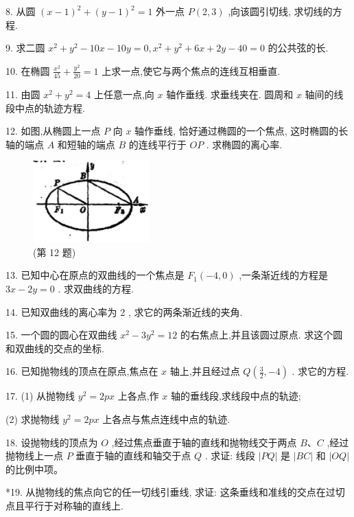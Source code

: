 \documentclass[lang=cn,newtx,12pt,scheme=chinese]{elegantbook}
\begin{document}
8. 从圆 \({\left( x - 1\right) }^{2} + {\left( y - 1\right) }^{2} = 1\) 外一点 \(P\left( {2,3}\right)\) ,向该圆引切线, 求切线的方程.

9. 求二圆 \({x}^{2} + {y}^{2} - {10x} - {10y} = 0,{x}^{2} + {y}^{2} + {6x} + {2y} - {40} = 0\) 的公共弦的长.

10. 在椭圆 \(\frac{{x}^{2}}{45} + \frac{{y}^{2}}{20} = 1\) 上求一点,使它与两个焦点的连线互相垂直.

11. 由圆 \({x}^{2} + {y}^{2} = 4\) 上任意一点,向 \(x\) 轴作垂线. 求垂线夹在. 圆周和 \(x\) 轴间的线段中点的轨迹方程.

12. 如图,从椭圆上一点 \(P\) 向 \(x\) 轴作垂线, 恰好通过椭圆的一个焦点, 这时椭圆的长轴的端点 \(A\) 和短轴的端点 \(B\) 的连线平行于 \({OP}\) . 求椭圆的离心率.

\begin{figure}[h]
  \centering
  \includegraphics[max width=0.4\textwidth]{images/01912cc2-ffb6-728e-9ae7-b113ff05c64b_130_291818.jpg}
  \caption{(第 12 题)}
\end{figure}

13. 已知中心在原点的双曲线的一个焦点是 \({F}_{1}\left( {-4,0}\right)\) ,一条渐近线的方程是 \({3x} - {2y} = 0\) . 求双曲线的方程.

14. 已知双曲线的离心率为 2 , 求它的两条渐近线的夹角.

15. 一个圆的圆心在双曲线 \({x}^{2} - 3{y}^{2} = {12}\) 的右焦点上,并且该圆过原点. 求这个圆和双曲线的交点的坐标.

16. 已知抛物线的顶点在原点,焦点在 \(x\) 轴上,并且经过点 \(Q\left( {\frac{3}{2}, - 4}\right)\) . 求它的方程.

17. (1) 从抛物线 \({y}^{2} = {2px}\) 上各点,作 \(x\) 轴的垂线段,求线段中点的轨迹;

(2) 求抛物线 \({y}^{2} = {2px}\) 上各点与焦点连线中点的轨迹.

18. 设抛物线的顶点为 \(O\) ,经过焦点垂直于轴的直线和抛物线交于两点 \(B\text{、}C\) ,经过抛物线上一点 \(P\) 垂直于轴的直线和轴交于点 \(Q\) . 求证: 线段 \(\left| {PQ}\right|\) 是 \(\left| {BC}\right|\) 和 \(\left| {OQ}\right|\) 的比例中项。

*19. 从抛物线的焦点向它的任一切线引垂线, 求证: 这条垂线和准线的交点在过切点且平行于对称轴的直线上.
\end{document}
